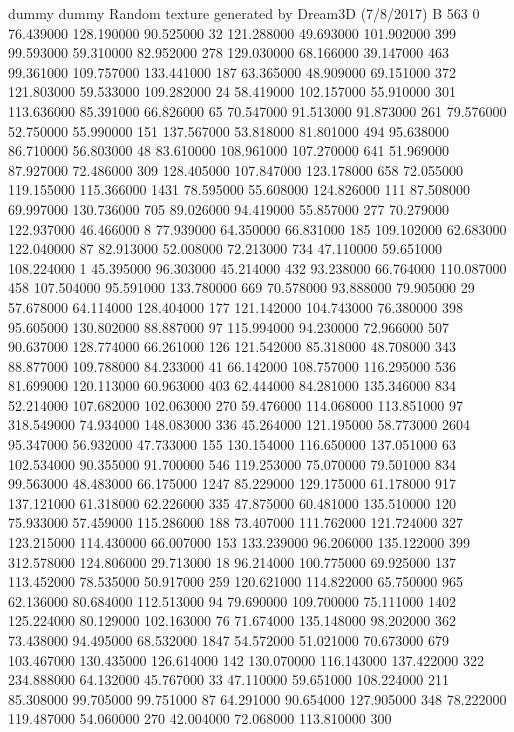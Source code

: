 dummy
dummy
Random texture generated by Dream3D (7/8/2017)
B	563	0
76.439000	128.190000	90.525000	32
121.288000	49.693000	101.902000	399
99.593000	59.310000	82.952000	278
129.030000	68.166000	39.147000	463
99.361000	109.757000	133.441000	187
63.365000	48.909000	69.151000	372
121.803000	59.533000	109.282000	24
58.419000	102.157000	55.910000	301
113.636000	85.391000	66.826000	65
70.547000	91.513000	91.873000	261
79.576000	52.750000	55.990000	151
137.567000	53.818000	81.801000	494
95.638000	86.710000	56.803000	48
83.610000	108.961000	107.270000	641
51.969000	87.927000	72.486000	309
128.405000	107.847000	123.178000	658
72.055000	119.155000	115.366000	1431
78.595000	55.608000	124.826000	111
87.508000	69.997000	130.736000	705
89.026000	94.419000	55.857000	277
70.279000	122.937000	46.466000	8
77.939000	64.350000	66.831000	185
109.102000	62.683000	122.040000	87
82.913000	52.008000	72.213000	734
47.110000	59.651000	108.224000	1
45.395000	96.303000	45.214000	432
93.238000	66.764000	110.087000	458
107.504000	95.591000	133.780000	669
70.578000	93.888000	79.905000	29
57.678000	64.114000	128.404000	177
121.142000	104.743000	76.380000	398
95.605000	130.802000	88.887000	97
115.994000	94.230000	72.966000	507
90.637000	128.774000	66.261000	126
121.542000	85.318000	48.708000	343
88.877000	109.788000	84.233000	41
66.142000	108.757000	116.295000	536
81.699000	120.113000	60.963000	403
62.444000	84.281000	135.346000	834
52.214000	107.682000	102.063000	270
59.476000	114.068000	113.851000	97
318.549000	74.934000	148.083000	336
45.264000	121.195000	58.773000	2604
95.347000	56.932000	47.733000	155
130.154000	116.650000	137.051000	63
102.534000	90.355000	91.700000	546
119.253000	75.070000	79.501000	834
99.563000	48.483000	66.175000	1247
85.229000	129.175000	61.178000	917
137.121000	61.318000	62.226000	335
47.875000	60.481000	135.510000	120
75.933000	57.459000	115.286000	188
73.407000	111.762000	121.724000	327
123.215000	114.430000	66.007000	153
133.239000	96.206000	135.122000	399
312.578000	124.806000	29.713000	18
96.214000	100.775000	69.925000	137
113.452000	78.535000	50.917000	259
120.621000	114.822000	65.750000	965
62.136000	80.684000	112.513000	94
79.690000	109.700000	75.111000	1402
125.224000	80.129000	102.163000	76
71.674000	135.148000	98.202000	362
73.438000	94.495000	68.532000	1847
54.572000	51.021000	70.673000	679
103.467000	130.435000	126.614000	142
130.070000	116.143000	137.422000	322
234.888000	64.132000	45.767000	33
47.110000	59.651000	108.224000	211
85.308000	99.705000	99.751000	87
64.291000	90.654000	127.905000	348
78.222000	119.487000	54.060000	270
42.004000	72.068000	113.810000	300
